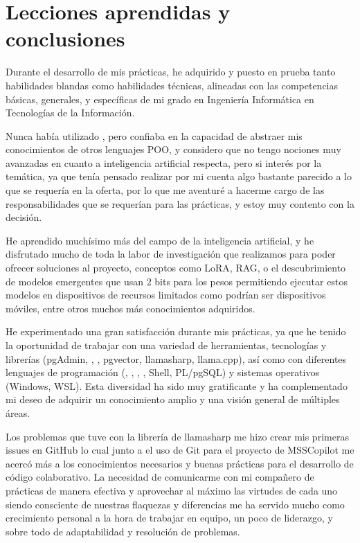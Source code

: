\chapter{Lecciones aprendidas y conclusiones}
Durante el desarrollo de mis prácticas, he adquirido y puesto en prueba tanto habilidades blandas como habilidades técnicas, alineadas con las competencias básicas, generales, y específicas de mi grado en Ingeniería Informática en Tecnologías de la Información.

Nunca había utilizado \href{https://dotnet.microsoft.com/es-es/languages/csharp}{}, pero confiaba en la capacidad de abstraer mis conocimientos de otros lenguajes POO, y considero que no tengo nociones muy avanzadas en cuanto a inteligencia artificial respecta, pero si interés por la temática, ya que tenía pensado realizar por mi cuenta algo bastante parecido a lo que se requería en la oferta, por lo que me aventuré a hacerme cargo de las responsabilidades que se requerían para las prácticas, y estoy muy contento con la decisión.

He aprendido muchísimo más del campo de la inteligencia artificial, y he disfrutado mucho de toda la labor de investigación que realizamos para poder ofrecer soluciones al proyecto, conceptos como LoRA, RAG, o el descubrimiento de modelos \href{https://en.wikipedia.org/wiki/Large_language_model}{} emergentes que usan 2 bits para los pesos permitiendo ejecutar estos modelos en dispositivos de recursos limitados como podrían ser dispositivos móviles, entre otros muchos más conocimientos adquiridos.

He experimentado una gran satisfacción durante mis prácticas, ya que he tenido la oportunidad de trabajar con una variedad de herramientas, tecnologías y librerías (pgAdmin, \href{https://www.sqlite.org/}{}, 
\href{https://es.wikipedia.org/wiki/CUDA}{}, pgvector, llamasharp, llama.cpp), así como con diferentes lenguajes de programación (\href{https://en.wikipedia.org/wiki/C_(programming_language)}{}, \href{https://en.wikipedia.org/wiki/C%2B%2B}{\bold{C++}}, \href{https://dotnet.microsoft.com/es-es/languages/csharp}{\bold{C\#}}, \href{https://www.python.org/}{\bold{Python}}, Shell, PL/pgSQL) y sistemas operativos (Windows, WSL). Esta diversidad ha sido muy gratificante y ha complementado mi deseo de adquirir un conocimiento amplio y una visión general de múltiples áreas.

Los problemas que tuve con la librería de llamasharp me hizo crear mis primeras issues en GitHub lo cual junto a el uso de Git para el proyecto de MSSCopilot me acercó más a los conocimientos necesarios y buenas prácticas para el desarrollo de código colaborativo. 
\newpage
La necesidad de comunicarme con mi compañero de prácticas de manera efectiva y aprovechar al máximo las virtudes de cada uno siendo consciente de nuestras flaquezas y diferencias me ha servido mucho como crecimiento personal a la hora de trabajar en equipo, un poco de liderazgo, y sobre todo de adaptabilidad y resolución de problemas.

